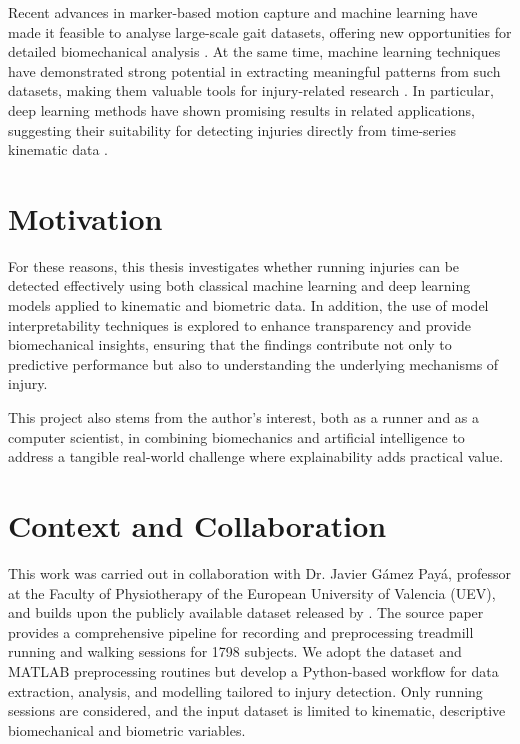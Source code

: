 Recent advances in marker-based motion capture and machine learning have made it feasible to analyse large-scale gait datasets, offering new opportunities for detailed biomechanical analysis \citep{Harris2022}. At the same time, machine learning techniques have demonstrated strong potential in extracting meaningful patterns from such datasets, making them valuable tools for injury-related research \citep{Kokkotis2022}. In particular, deep learning methods have shown promising results in related applications, suggesting their suitability for detecting injuries directly from time-series kinematic data \citep{Sadr2025}.  


\section{Motivation}\label{sec:intro-motivation}

For these reasons, this thesis investigates whether running injuries can be detected effectively using both classical machine learning and deep learning models applied to kinematic and biometric data. In addition, the use of model interpretability techniques is explored to enhance transparency and provide biomechanical insights, ensuring that the findings contribute not only to predictive performance but also to understanding the underlying mechanisms of injury.

This project also stems from the author's interest, both as a runner and as a computer scientist, in combining biomechanics and artificial intelligence to address a tangible real-world challenge where explainability adds practical value.

\section{Context and Collaboration}\label{sec:intro-context}
This work was carried out in collaboration with Dr. Javier Gámez Payá, professor at the Faculty of Physiotherapy of the European University of Valencia (UEV), and builds upon the publicly available dataset released by \citet{Ferber2024}. The source paper provides a comprehensive pipeline for recording and preprocessing treadmill running and walking sessions for 1798 subjects. We adopt the dataset and MATLAB preprocessing routines but develop a Python-based workflow for data extraction, analysis, and modelling tailored to injury detection. Only running sessions are considered, and the input dataset is limited to kinematic, descriptive biomechanical and biometric variables.

